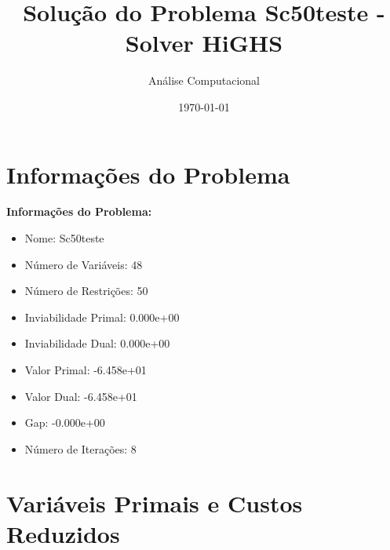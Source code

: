 \documentclass[12pt]{article}
\title{Solução do Problema Sc50teste - Solver HiGHS}
\author{Análise Computacional}
\date{\today}
\begin{document}
\maketitle

\section{Informações do Problema}

\textbf{Informações do Problema:}
\begin{itemize}
\item Nome: Sc50teste
\item Número de Variáveis: 48
\item Número de Restrições: 50
\item Inviabilidade Primal: 0.000e+00
\item Inviabilidade Dual: 0.000e+00
\item Valor Primal: -6.458e+01
\item Valor Dual: -6.458e+01
\item Gap: -0.000e+00
\item Número de Iterações: 8
\end{itemize}


\section{Variáveis Primais e Custos Reduzidos}
\end{document}
